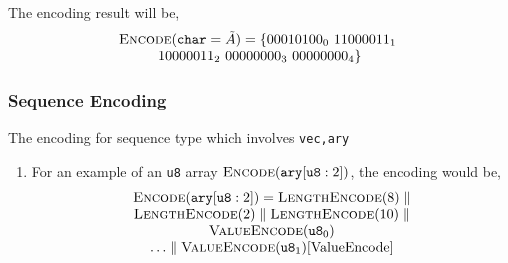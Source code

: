\documentclass[../alan-handbook.tex]{subfiles}
\begin{document}
The encoding result will be,
$$
\begin{matrix}
    \Call{Encode}{\texttt{char} = \tilde{A}} = \{00010100_0 \ 11000011_1 \ \\
    10000011_2 \ 00000000_3 \ 00000000_4\}
\end{matrix}
$$

\subsubsection{Sequence Encoding} \label{Eg:SequenceEncoding}

The encoding for sequence type which involves \texttt{vec,ary}

\begin{enumerate}
    \item For an example of an \texttt{u8} array $\Call{Encode}{\texttt{ary}[\texttt{u8}:2]}$, the encoding would be,
            $$
            \begin{matrix}
                \Call{Encode}{\texttt{ary}[\texttt{u8}:2]} = \Call{LengthEncode}{8} \parallel \\ 
                \Call{LengthEncode}{2} \parallel \Call{LengthEncode}{10} \parallel \\
                \Call{ValueEncode}{\texttt{u8}_0} \\
                \ldots \parallel \Call{ValueEncode}{\texttt{u8}_1} \ref{ValueEncode}
            \end{matrix}
            $$


\end{enumerate}
\end{document}
